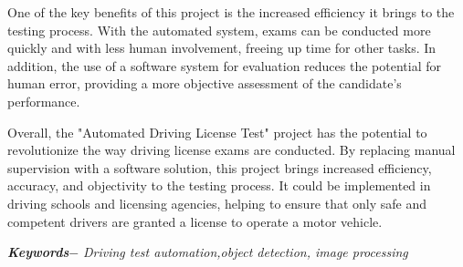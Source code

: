 One of the key benefits of this project is the increased efficiency it brings to the testing process. With the automated system, exams can be conducted more quickly and with less human involvement, freeing up time for other tasks. In addition, the use of a software system for evaluation reduces the potential for human error, providing a more objective assessment of the candidate's performance.

Overall, the "Automated Driving License Test" project has the potential to revolutionize the way driving license exams are conducted. By replacing manual supervision with a software solution, this project brings increased efficiency, accuracy, and objectivity to the testing process. It could be implemented in driving schools and licensing agencies, helping to ensure that only safe and competent drivers are granted a license to operate a motor vehicle.


\par
\textbf{\textit{Keywords$-$}} \emph{Driving test automation,object detection, image processing}


{
\KECadjusttocspacings %
\makeatletter
\def\@makeschapterhead#1{%
  {\newpage \parindent \z@ \raggedright
    \normalfont
    \interlinepenalty\@M
    \center \fontsize{16pt}{1} \bfseries \MakeUppercase{#1}\par\nobreak
    \vskip 18\p@ %
  }}
\makeatother 

\tableofcontents %
\listoffigures %
\listoftables %
}

